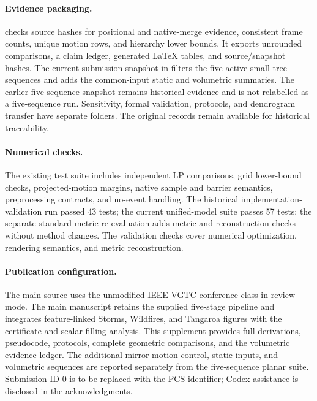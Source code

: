 \documentclass[10pt,letterpaper]{article}
\theoremstyle{remark}\newtheorem{remark}[lemma]{Remark}
\begin{document}
\paragraph{Evidence packaging.}  checks source hashes for positional and native-merge evidence, consistent frame counts, unique motion rows, and hierarchy lower bounds. It exports unrounded comparisons, a claim ledger, generated LaTeX tables, and source/snapshot hashes. The current submission snapshot in  filters the five active small-tree sequences and adds the common-input static and volumetric summaries. The earlier five-sequence snapshot remains historical evidence and is not relabelled as a five-sequence run. Sensitivity, formal validation, protocols, and dendrogram transfer have separate folders. The original records remain available for historical traceability.

\paragraph{Numerical checks.} The existing test suite includes independent LP comparisons, grid lower-bound checks, projected-motion margins, native sample and barrier semantics, preprocessing contracts, and no-event handling. The historical implementation-validation run passed 43 tests; the current unified-model suite passes 57 tests; the separate standard-metric re-evaluation adds metric and reconstruction checks without method changes. The validation checks cover numerical optimization, rendering semantics, and metric reconstruction.

\paragraph{Publication configuration.} The main source uses the unmodified IEEE VGTC conference class in review mode. The main manuscript retains the supplied five-stage pipeline and integrates feature-linked Storms, Wildfires, and Tangaroa figures with the certificate and scalar-filling analysis. This supplement provides full derivations, pseudocode, protocols, complete geometric comparisons, and the volumetric evidence ledger. The additional mirror-motion control, static inputs, and volumetric sequences are reported separately from the five-sequence planar suite. Submission ID 0 is to be replaced with the PCS identifier; Codex assistance is disclosed in the acknowledgments.
\clearpage

\clearpage

\clearpage




\end{document}
